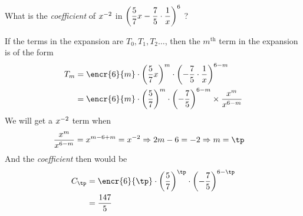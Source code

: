 



\gcalcexpr[0]

\question[3] What is the \textit{coefficient} of $x^{-2}$ in $\left( \dfrac{5}{7} x - \dfrac{7}{5}\cdot\dfrac{1}{x} \right)^{6}$ ?


\watchout

\ifprintanswers
\fi 

\begin{solution}[\halfpage]
  If the terms in the expansion are $T_0, T_1, T_2 \ldots$, then the $m^{\text{th}}$ term 
  in the expansion is of the form 
	\begin{align}
	   T_m &= \encr{\vbthree}{m}\cdot\left( \vbone x \right)^{m}\cdot\left( -\vbtwo\cdot\dfrac{1}{x}\right)^{\vbthree - m} \\
	   &= \encr{\vbthree}{m}\cdot\left(\vbone\right)^{m}\cdot\left( -\vbtwo \right)^{\vbthree - m}\times\dfrac{x^m}{x^{\vbthree - m}}
	\end{align}
	We will get a $x^{-2}$ term when 
	\begin{align}
		\dfrac{x^m}{x^{\vbthree - m}} &= x^{m-\vbthree + m} = x^{\vbfour} \Rightarrow 2m - \vbthree = \vbfour \Rightarrow m = \tp
	\end{align}
	And the \textit{coefficient} then would be 
	\begin{align}
		C_{\tp} &= \encr{\vbthree}{\tp}\cdot\left(\vbone\right)^{\tp}\cdot\left( -\vbtwo \right)^{\vbthree - \tp} \\
		&= \vbfive
	\end{align}
\end{solution}

